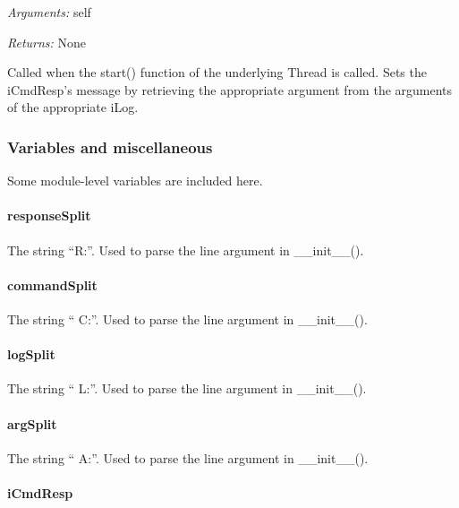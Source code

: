 \documentclass[12pt,letterpaper]{article}
\begin{document}
\emph{Arguments:} self

\emph{Returns:} None

Called when the start() function of the underlying Thread is called. Sets the iCmdResp's message by retrieving the appropriate argument from the arguments of the appropriate iLog.



%
%
\subsubsection{Variables and miscellaneous}
\label{4.7.2}

Some module-level variables are included here.

\setcounter{paragraph}{-1}


%
%
\paragraph{responseSplit}
\label{4.7.2.0}

The string ``R:''. Used to parse the line argument in \_\_init\_\_().



%
%
\paragraph{commandSplit}
\label{4.7.2.1}

The string `` C:''. Used to parse the line argument in \_\_init\_\_().



%
%
\paragraph{logSplit}
\label{4.7.2.2}

The string `` L:''. Used to parse the line argument in \_\_init\_\_().



%
%
\paragraph{argSplit}
\label{4.7.2.3}

The string `` A:''. Used to parse the line argument in \_\_init\_\_().



%
%
\paragraph{iCmdResp}
\label{4.7.2.4}
\end{document}

